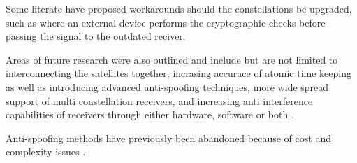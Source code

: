 Some literate have proposed workarounds should the constellations be upgraded, such as \cite{RN19} where an external device performs the cryptographic checks before
passing the signal to the outdated reciver.

Areas of future research were also outlined and include but are not limited to interconnecting the satellites together, incrasing accurace of
atomic time keeping as well as introducing advanced anti-spoofing techniques, more wide spread support of multi constellation receivers, and increasing anti interference
capabilities of receivers through either hardware, software or both \cite{RN33}.

Anti-spoofing methods have previously been abandoned because of cost and complexity issues \cite{RN7}.